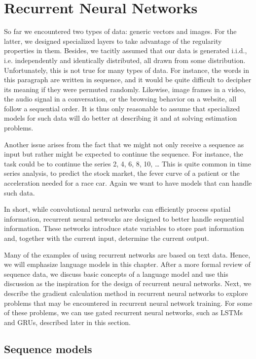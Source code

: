 \section{Recurrent Neural Networks}\label{sec:rnn}

So far we encountered two types of data: generic vectors and images. For the latter, we designed specialized layers to take advantage of the regularity properties in them. Besides, we tacitly assumed that our data is generated i.i.d., i.e. independently and identically distributed, all drawn from some distribution. Unfortunately, this is not true for many types of data. For instance, the words in this paragraph are written in sequence, and it would be quite difficult to decipher its meaning if they were permuted randomly. Likewise, image frames in a video, the audio signal in a conversation, or the browsing behavior on a website, all follow a sequential order. It is thus only reasonable to assume that specialized models for such data will do better at describing it and at solving estimation problems.

Another issue arises from the fact that we might not only receive a sequence as input but rather might be expected to continue the sequence. For instance, the task could be to continue the series 2, 4, 6, 8, 10, … This is quite common in time series analysis, to predict the stock market, the fever curve of a patient or the acceleration needed for a race car. Again we want to have models that can handle such data.

In short, while convolutional neural networks can efficiently process spatial information, recurrent neural networks are designed to better handle sequential information. These networks introduce state variables to store past information and, together with the current input, determine the current output.

Many of the examples of using recurrent networks are based on text data. Hence, we will emphasize language models in this chapter. After a more formal review of sequence data, we discuss basic concepts of a language model and use this discussion as the inspiration for the design of recurrent neural networks. Next, we describe the gradient calculation method in recurrent neural networks to explore problems that may be encountered in recurrent neural network training. For some of these problems, we can use gated recurrent neural networks, such as LSTMs and GRUs, described later in this section.

\subsection{Sequence models}\label{subsec:sequence_models}

